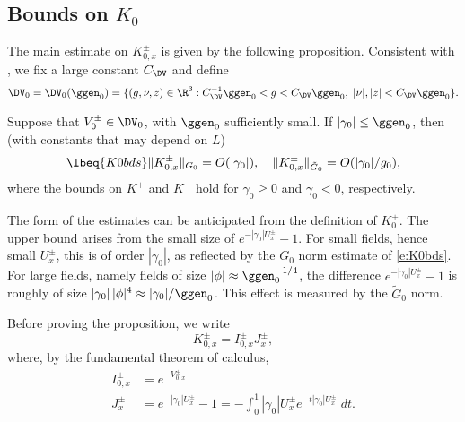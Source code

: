
\subsection{Bounds on \texorpdfstring{$K_0$}{K0}}
\label{sec:K0bds}


The main estimate on $K^\pm_{0,x}$ is given by the following proposition.
Consistent with \cite[\eqref{IE-e:DV1-bis}]{BS-rg-IE}, we
fix a large constant $C_\DV$ and define
\begin{equation}
\label{e:DV0}
    \DV_0 = \DV_0(\ggen_0) = \{(g,\nu,z) \in \R^3 : C_{\DV}^{-1}\ggen_0 < g < C_{\DV}\ggen_0,
    \; |\nu|,|z| < C_{\DV}\ggen_0\}.
\end{equation}

\begin{prop}
\label{prop:K0bd}
Suppose that $V^\pm_0 \in \DV_0$, with $\ggen_0$ sufficiently small.
If $|\gamma_0| \leq  \ggen_0$, then
(with constants that may depend on $L$)
\begin{equation}
\lbeq{K0bds}
\|K^\pm_{0,x}\|_{G_0} = O(|\gamma_0|),
\quad
\|K^\pm_{0,x}\|_{\tilde G_0} = O(|\gamma_0|/g_0),
\end{equation}
where the bounds on $K^+$ and $K^-$ hold for $\gamma_0 \geq 0$
and $\gamma_0 < 0$, respectively.
\end{prop}


The form of the estimates  can be anticipated from the definition of
$K_0^\pm$.
The upper bound arises from the small size of
$e^{-|\gamma_0|U_x^\pm}-1$.  For small fields, hence small $U_x^\pm$, this is of order $|\gamma_0|$,
as reflected by the $G_0$ norm estimate of \eqref{e:K0bds}.
For large fields, namely fields of size $|\phi| \approx \ggen_{0}^{-1/4}$, the difference
$e^{-|\gamma_0|U_x^\pm}-1$ is roughly of size $|\gamma_0|\,|\phi|^4 \approx |\gamma_0|/\ggen_0$.
This effect is measured by the $\tilde G_0$ norm.

Before proving the proposition, we
write
\begin{equation}
K^\pm_{0,x} = I^\pm_{0,x} J^\pm_x
  \label{e:KIJ},
\end{equation}
where, by the fundamental theorem of calculus,
\begin{align}
    I^\pm_{0,x} &= e^{-V^\pm_{0,x}} \\
    J^\pm_x
    &= e^{-|\gamma_0|U^\pm_x} - 1
    = - \int_0^{1} |\gamma_0| U^\pm_x e^{-t |\gamma_0| U^\pm_x} \; dt.
\label{e:J}
\end{align}

